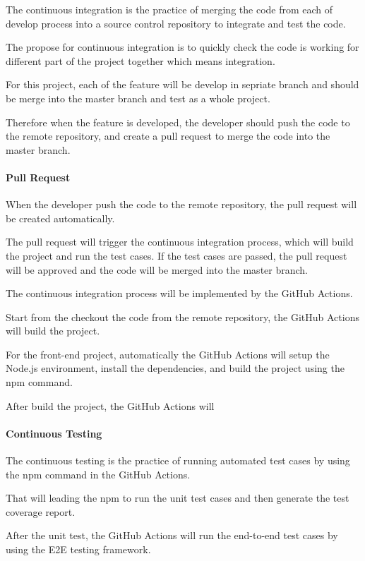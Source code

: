 The continuous integration is the practice of merging the code from each of develop process 
into a source control repository to integrate and test the code.

The propose for continuous integration is to quickly check the code is working for different part
of the project together which means integration.

For this project, each of the feature will be develop in sepriate branch and should be merge into
the master branch and test as a whole project.

Therefore when the feature is developed, the developer should push the code to the remote repository, 
and create a pull request to merge the code into the master branch.

\paragraph{Pull Request}

When the developer push the code to the remote repository, the pull request will be created automatically.

The pull request will trigger the continuous integration process, which will build the project and run the test cases.
If the test cases are passed, the pull request will be approved and the code will be merged into the master branch.

The continuous integration process will be implemented by the GitHub Actions.

Start from the checkout the code from the remote repository, 
the GitHub Actions will build the project.

For the front-end project, automatically the GitHub Actions will setup the Node.js environment,
install the dependencies, and build the project using the npm command.

After build the project, the GitHub Actions will 

\paragraph{Continuous Testing}

The continuous testing is the practice of running automated test cases by using the npm command in the GitHub Actions.

That will leading the npm to run the unit test cases and then generate the test coverage report.

After the unit test, the GitHub Actions will run the end-to-end test cases by using the E2E testing framework.
